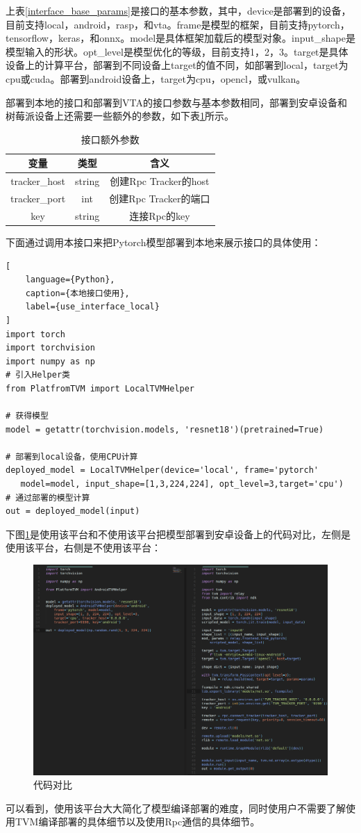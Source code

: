 上表\ref{interface_base_params}是接口的基本参数，其中，device是部署到的设备，目前支持local，android，rasp，和vta。frame是模型的框架，目前支持pytorch，tensorflow，keras，和onnx。model是具体框架加载后的模型对象。input\_shape是模型输入的形状。opt\_level是模型优化的等级，目前支持1，2，3。target是具体设备上的计算平台，部署到不同设备上target的值不同，如部署到local，target为cpu或cuda。部署到android设备上，target为cpu，opencl，或vulkan。

部署到本地的接口和部署到VTA的接口参数与基本参数相同，部署到安卓设备和树莓派设备上还需要一些额外的参数，如下表\ref{interface_extra_params}所示。

\begin{table}
    \centering
    \caption{接口额外参数}
    \label{interface_extra_params}
    \begin{tabular}{c|c|c}
        \hline
        变量            & 类型     & 含义                 \\ \hline
        tracker\_host & string & 创建Rpc Tracker的host \\ \hline
        tracker\_port & int    & 创建Rpc Tracker的端口   \\ \hline
        key           & string & 连接Rpc的key          \\ \hline
    \end{tabular}
\end{table}

下面通过调用本接口来把Pytorch模型部署到本地来展示接口的具体使用：

\begin{lstlisting}[
    language={Python},
    caption={本地接口使用},
    label={use_interface_local}
]
import torch
import torchvision
import numpy as np
# 引入Helper类
from PlatfromTVM import LocalTVMHelper

# 获得模型
model = getattr(torchvision.models, 'resnet18')(pretrained=True)

# 部署到local设备，使用CPU计算
deployed_model = LocalTVMHelper(device='local', frame='pytorch'
   model=model, input_shape=[1,3,224,224], opt_level=3,target='cpu')
# 通过部署的模型计算
out = deployed_model(input)
\end{lstlisting}

下图\ref{compare}是使用该平台和不使用该平台把模型部署到安卓设备上的代码对比，左侧是使用该平台，右侧是不使用该平台：

\begin{figure}[h!]
    \centering
    \includegraphics[width=180bp]{figure/compare.png}
    \caption{代码对比}
    \label{compare}
\end{figure}

可以看到，使用该平台大大简化了模型编译部署的难度，同时使用户不需要了解使用TVM编译部署的具体细节以及使用Rpc通信的具体细节。